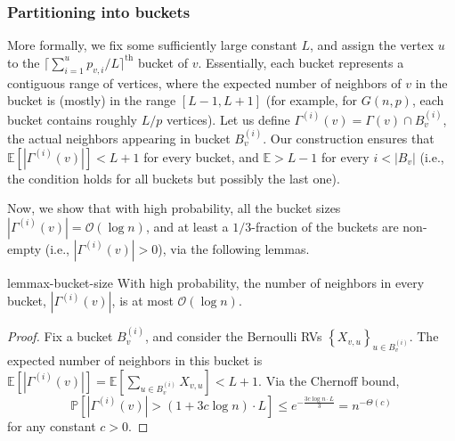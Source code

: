 \subsubsection{Partitioning into buckets}
\label{sec:bucket_partition}
More formally, we fix some sufficiently large constant $L$,
and assign the vertex $u$ to the $\lceil\sum^{u}_{i=1} p_{v,i}/L\rceil^\textrm{th}$ bucket of $v$.
Essentially, each bucket represents a contiguous range of vertices,
where the expected number of neighbors of $v$ in the bucket is (mostly) in the range $[L-1,L+1]$
(for example, for $G(n,p)$, each bucket contains roughly $L/p$ vertices).
Let us define $\Gamma^{(i)}(v) = \Gamma(v) \cap B_v^{(i)}$,
the actual neighbors appearing in bucket $B^{(i)}_v$.
Our construction ensures that $\mathbb E \left[|\Gamma^{(i)}(v)|\right] < L+1$ for every bucket,
and $\mathbb E > L-1$ for every $i < |B_v|$
(i.e., the condition holds for all buckets but possibly the last one).

Now, we show that with high probability, all the bucket sizes $|\Gamma^{(i)}(v)|=\mathcal{O}(\log n)$, and at least a $1/3$-fraction of the buckets are non-empty (i.e., $|\Gamma^{(i)}(v)|>0$), via the following lemmas.

\begin{restatable}{lem}{max-bucket-size}
\label{lem:max_bucket_size}
With high probability, the number of neighbors in every bucket, $|\Gamma^{(i)}(v)|$, is at most $ \mathcal{O}(\log n)$.
\end{restatable}
\begin{proof}
Fix a bucket $B_v^{(i)}$, and consider the Bernoulli RVs $\left\{ X_{v,u}\right\}_{u\in B_v^{(i)}}$.
The expected number of neighbors in this bucket is
$ \textstyle\mathbb{E} \left[ |\Gamma^{(i)}(v)| \right] =\mathbb{E} \left[ \sum_{u\in B_v^{(i)}} X_{v,u} \right] < L+1$.
Via the Chernoff bound,
$$
\mathbb{P} \left[ |\Gamma^{(i)}(v)|> (1+3c\log n)\cdot L \right]
\le e^{-\frac{3c\log n\cdot L}{3}} = n^{-\Theta(c)}
$$
for any constant $c > 0$.
\end{proof}

